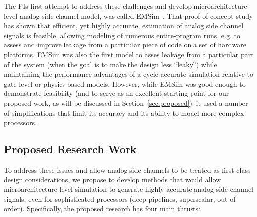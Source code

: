 \documentclass[11 pt]{article}
\begin{document}
The PIs first attempt to address these challenges and develop microarchitecture-level analog side-channel model, was called EMSim~\cite{Nader2020}. That proof-of-concept study has shown that efficient, yet highly accurate, estimation of analog side channel signals is feasible, allowing modeling of numerous entire-program runs, e.g. to assess and improve leakage from a particular piece of code on a set of hardware platforms. EMSim was also the first model to asses leakage from a particular part of the system (when the goal is to make the design less ``leaky'') while maintaining the performance advantages of a cycle-accurate simulation relative to gate-level or physics-based models. However, while EMSim was good enough to demonstrate feasibility (and to serve as an excellent starting point for our proposed work, as will be discussed in Section~\ref{sec:proposed}), it used a number of simplifications that limit its accuracy and its ability to model more complex processors.

\subsection{Proposed Research Work}
To address these issues and allow analog side channels to be treated as first-class design considerations, we propose to develop methods that would allow microarchitecture-level simulation to generate highly accurate analog side channel signals, even for sophisticated processors (deep pipelines, superscalar, out-of-order). Specifically, the proposed research has four main thrusts:
\end{document}
